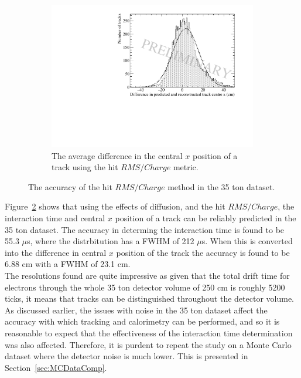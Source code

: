 \begin{figure}[h!]
  \begin{subfigure}{0.6\textwidth}
    \centering
    \includegraphics[width=\textwidth]{Data_AvXPosDiff_RMS_Int}
    \caption{The average difference in the central $x$ position of a track using the hit $RMS/Charge$ metric.}
    \label{fig:DiffDataAvDiff_RMS_Int_X}
  \end{subfigure}
  \caption[The accuracy of the hit $RMS/Charge$ method in the 35 ton dataset]
          {The accuracy of the hit $RMS/Charge$ method in the 35 ton dataset.}
  \label{fig:DiffDataAvDiff_RMS_Int}
\end{figure}

Figure~\ref{fig:DiffDataAvDiff_RMS_Int} shows that using the effects of diffusion, and the hit $RMS/Charge$, the interaction time and central $x$ position of a track can be reliably predicted in the 35 ton dataset. The accuracy in determing the interaction time is found to be 55.3 $\mu$s, where the distrbitution has a FWHM of 212 $\mu$s. When this is converted into the difference in central $x$ position of the track the accuracy is found to be 6.88 cm with a FWHM of 23.1 cm. \\

The resolutions found are quite impressive as given that the total drift time for electrons through the whole 35 ton detector volume of 250 cm is roughly 5200 ticks, it means that tracks can be distinguished throughout the detector volume. As discussed earlier, the issues with noise in the 35 ton dataset affect the accuracy with which tracking and calorimetry can be performed, and so it is reasonable to expect that the effectiveness of the interaction time determination was also affected. Therefore, it is purdent to repeat the study on a Monte Carlo dataset where the detector noise is much lower. This is presented in Section~\ref{sec:MCDataComp}.


